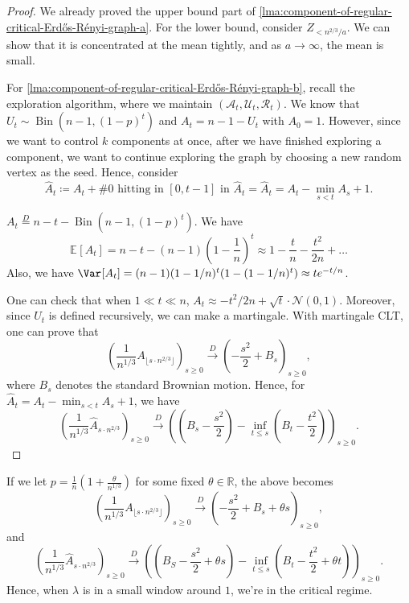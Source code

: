 \begin{proof}
	We already proved the upper bound part of \autoref{lma:component-of-regular-critical-Erdős-Rényi-graph-a}. For the lower bound, consider \(Z_{< n^{2 / 3} / a}\). We can show that it is concentrated at the mean tightly, and as \(a \to \infty \), the mean is small.

	For \autoref{lma:component-of-regular-critical-Erdős-Rényi-graph-b}, recall the exploration algorithm, where we maintain \((\mathcal{A} _t, \mathcal{U} _t, \mathcal{R} _t)\). We know that \(U_t \sim \operatorname{Bin}(n-1, (1-p)^t) \) and \(A_t = n-1-U_t\) with \(A_0 = 1\). However, since we want to control \(k\) components at once, after we have finished exploring a component, we want to continue exploring the graph by choosing a new random vertex as the seed. Hence, consider
	\[
		\hat{A} _t
		\coloneqq A_t + \text{\#0 hitting in \([0, t-1]\) in \(\hat{A}_t\)}
		= \hat{A} _t = A_t - \min _{s < t} A_s + 1.
	\]
	\begin{prev}
		\(A_t \overset{D}{=} n-t-\operatorname{Bin}(n-1, (1-p)^t) \). We have
		\[
			\mathbb{E}_{}[A_t]
			= n-t - (n-1)\left( 1 - \frac{1}{n} \right) ^t
			\approx 1 - \frac{t}{n} - \frac{t^2}{2n} + \dots
		\]
		Also, we have \(\Var_{}[A_t] = (n-1)(1- 1 / n)^t (1 - (1 - 1 / n)^t) \approx t e^{-t / n}\).
	\end{prev}
	One can check that when \(1 \ll t \ll n\), \(A_t \approx - t^2 / 2n + \sqrt{t} \cdot \mathcal{N} (0, 1) \). Moreover, since \(U_t\) is defined recursively, we can make a martingale. With martingale CLT, one can prove that
	\[
		\left( \frac{1}{n^{1 / 3}} A_{\lfloor s \cdot n^{2 / 3} \rfloor } \right) _{s \geq 0}
		\overset{D}{\to} \left( - \frac{s^2}{2} + B_s \right) _{s \geq 0},
	\]
	where \(B_s\) denotes the standard Brownian motion. Hence, for \(\hat{A} _t = A_t - \min _{s < t} A_s + 1\), we have
	\[
		\left( \frac{1}{n^{1 / 3}} \hat{A} _{s \cdot n^{2 / 3}} \right) _{s \geq 0}
		\overset{D}{\to} \left( \left( B_s - \frac{s^2}{2} \right) - \inf _{t \leq s} \left( B_t - \frac{t^2}{2} \right)  \right)_{s \geq 0}.
	\]
\end{proof}

\begin{remark}
	If we let \(p = \frac{1}{n} \left( 1 + \frac{\theta}{n^{1 / 3}} \right) \) for some fixed \(\theta \in \mathbb{R} \), the above becomes
	\[
		\left( \frac{1}{n^{1 / 3}} A_{\lfloor s \cdot n^{2 / 3} \rfloor } \right) _{s \geq 0}
		\overset{D}{\to} \left( - \frac{s^2}{2} + B_s + \theta s\right) _{s \geq 0},
	\]
	and
	\[
		\left( \frac{1}{n^{1 / 3}} \hat{A} _{s \cdot n^{2 / 3}} \right) _{s \geq 0}
		\overset{D}{\to} \left( \left( B_S - \frac{s^2}{2} + \theta s\right) - \inf _{t \leq s} \left( B_t - \frac{t^2}{2} + \theta t \right)  \right)_{s \geq 0}.
	\]
	Hence, when \(\lambda \) is in a small window around \(1\), we're in the critical regime.
\end{remark}

